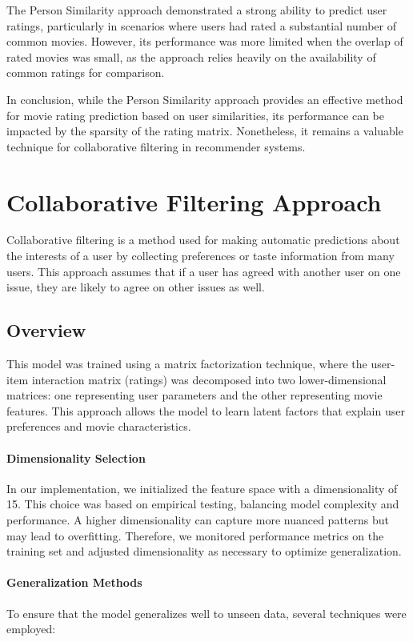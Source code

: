 \documentclass[a3paper,12pt]{article}
\begin{document}
The Person Similarity approach demonstrated a strong ability to predict user ratings,
particularly in scenarios where users had rated a substantial number of common movies.
However, its performance was more limited when the overlap of rated movies was small, as the approach relies heavily
on the availability of common ratings for comparison.

In conclusion, while the Person Similarity approach provides an effective method for movie rating prediction based on user
similarities, its performance can be impacted by the sparsity of the rating matrix.
Nonetheless, it remains a valuable technique for collaborative filtering in recommender systems.

\section{Collaborative Filtering Approach}
Collaborative filtering is a method used for making automatic predictions about the interests of a user by collecting preferences or taste information from many users. This approach assumes that if a user has agreed with another user on one issue, they are likely to agree on other issues as well.

\subsection{Overview}
This model was trained using a matrix factorization technique, where the user-item interaction matrix (ratings) was decomposed into two lower-dimensional matrices: one representing user parameters and the other representing movie features. This approach allows the model to learn latent factors that explain user preferences and movie characteristics.

\paragraph{Dimensionality Selection}
In our implementation, we initialized the feature space with a dimensionality of 15. This choice was based on empirical testing, balancing model complexity and performance. A higher dimensionality can capture more nuanced patterns but may lead to overfitting. Therefore, we monitored performance metrics on the training set and adjusted dimensionality as necessary to optimize generalization.

\paragraph{Generalization Methods}
To ensure that the model generalizes well to unseen data, several techniques were employed:
\end{document}
